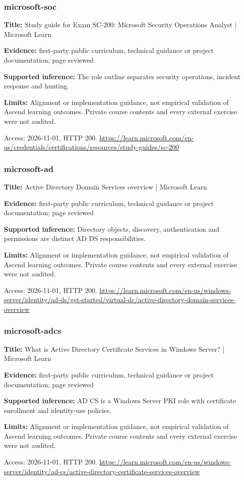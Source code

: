 \subsubsection{microsoft-soc}
\noindent\textbf{Title:} Study guide for Exam SC-200: Microsoft Security Operations Analyst | Microsoft Learn\par
\noindent\textbf{Evidence:} first-party public curriculum, technical guidance or project documentation; page reviewed\par
\noindent\textbf{Supported inference:} The role outline separates security operations, incident response and hunting.\par
\noindent\textbf{Limits:} Alignment or implementation guidance, not empirical validation of Ascend learning outcomes. Private course contents and every external exercise were not audited.\par
\noindent Access: 2026-11-01, HTTP 200. \url{https://learn.microsoft.com/en-us/credentials/certifications/resources/study-guides/sc-200}
\subsubsection{microsoft-ad}
\noindent\textbf{Title:} Active Directory Domain Services overview | Microsoft Learn\par
\noindent\textbf{Evidence:} first-party public curriculum, technical guidance or project documentation; page reviewed\par
\noindent\textbf{Supported inference:} Directory objects, discovery, authentication and permissions are distinct AD DS responsibilities.\par
\noindent\textbf{Limits:} Alignment or implementation guidance, not empirical validation of Ascend learning outcomes. Private course contents and every external exercise were not audited.\par
\noindent Access: 2026-11-01, HTTP 200. \url{https://learn.microsoft.com/en-us/windows-server/identity/ad-ds/get-started/virtual-dc/active-directory-domain-services-overview}
\subsubsection{microsoft-adcs}
\noindent\textbf{Title:} What is Active Directory Certificate Services in Windows Server? | Microsoft Learn\par
\noindent\textbf{Evidence:} first-party public curriculum, technical guidance or project documentation; page reviewed\par
\noindent\textbf{Supported inference:} AD CS is a Windows Server PKI role with certificate enrollment and identity-use policies.\par
\noindent\textbf{Limits:} Alignment or implementation guidance, not empirical validation of Ascend learning outcomes. Private course contents and every external exercise were not audited.\par
\noindent Access: 2026-11-01, HTTP 200. \url{https://learn.microsoft.com/en-us/windows-server/identity/ad-cs/active-directory-certificate-services-overview}
